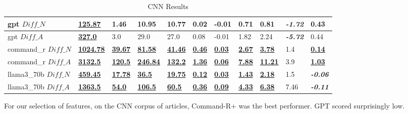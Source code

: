 \documentclass[runningheads,a4paper,11pt]{article}
\begin{document}
\begin{table}[!ht]
{\begin{tabular}{lllllllllll}
            gpt $Diff\_N$         & \textbf{\underline{125.87}}  & 1.46                       & 10.95                       & 10.77                      & 0.02                      & -0.01                     & 0.71                      & 0.81                       & \textbf{\textit{-1.72}} & 0.43                      \\ \midrule
            gpt $Diff\_A$         & \textbf{\underline{327.0}}   & 3.0                        & 29.0                        & 27.0                       & 0.08                      & -0.01                     & 1.82                      & 2.24                       & \textbf{\textit{-5.72}} & 0.44                      \\ \midrule
            command\_r $Diff\_N$  & \textbf{\underline{1024.78}} & \textbf{\underline{39.67}} & \textbf{\underline{81.58}}  & \textbf{\underline{41.46}} & \textbf{\underline{0.46}} & \textbf{\underline{0.03}} & \textbf{\underline{2.67}} & \textbf{\underline{3.78}}  & 1.4                     & \textbf{\underline{0.14}} \\ \midrule
            command\_r $Diff\_A$  & \textbf{\underline{3132.5}}  & \textbf{\underline{120.5}} & \textbf{\underline{246.84}} & \textbf{\underline{132.2}} & \textbf{\underline{1.36}} & \textbf{\underline{0.06}} & \textbf{\underline{7.88}} & \textbf{\underline{11.21}} & 3.9                     & \textbf{\underline{1.03}} \\ \midrule
            llama3\_70b $Diff\_N$ & \textbf{\underline{459.45}}  & \textbf{\underline{17.78}} & \textbf{\underline{36.5}}   & \textbf{\underline{19.75}} & \textbf{\underline{0.12}} & \textbf{\underline{0.03}} & \textbf{\underline{1.43}} & \textbf{\underline{2.18}}  & 1.5                     & \textbf{\textit{-0.06}}   \\ \midrule
            llama3\_70b $Diff\_A$ & \textbf{\underline{1363.5}}  & \textbf{\underline{54.0}}  & \textbf{\underline{106.5}}  & \textbf{\underline{60.5}}  & \textbf{\underline{0.36}} & \textbf{\underline{0.09}} & \textbf{\underline{4.33}} & \textbf{\underline{6.38}}  & 7.46                    & \textbf{\textit{-0.11}}   \\ \bottomrule
        \end{tabular}%
    }\caption{CNN Results}\label{table-prompt-1-cnn-dailymail}
\end{table}

For our selection of features, on the CNN corpus of articles, Command-R+ was the
best performer.
GPT scored surprisingly low.
\end{document}
